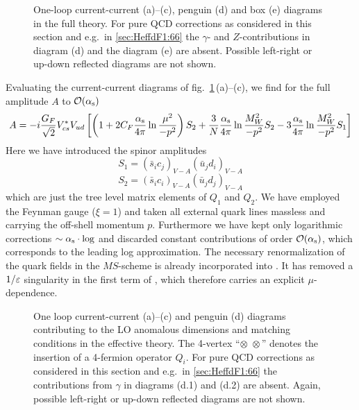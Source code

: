 \begin{figure}[htb]
\vspace{0.10in}
\centerline{
\epsfysize=3in
}
\vspace{0.08in}
\caption[]{One-loop current-current (a)--(c), penguin (d) and box (e)
diagrams in the full theory. For pure QCD corrections as considered in
this section and e.g.\ in \ref{sec:HeffdF1:66} the $\gamma$- and
$Z$-contributions in diagram (d) and the diagram (e) are absent.
Possible left-right or up-down reflected diagrams are not shown.
\label{fig:1loopful}}
\end{figure}

Evaluating the current-current diagrams of fig.~\ref{fig:1loopful}\,(a)--(c),
we find for the full amplitude $A$ to ${\cal O}(\alpha_{\rm s})$
\begin{equation}\label{amp}
A=-i{G_F\over\sqrt{2}}V^\ast_{cs}V_{ud}\left[\left(1+2C_F \frac{\alpha_{\rm s}}{4 \pi}
\ln{\mu^2\over -p^2}\right)S_2+{3\over N}\frac{\alpha_{\rm s}}{4 \pi}\ln{M^2_W\over -p^2} S_2-
3\frac{\alpha_{\rm s}}{4 \pi}\ln{M^2_W\over -p^2} S_1\right]   \end{equation}
Here we have introduced the spinor amplitudes
\begin{equation}\label{s1c} S_1=(\bar s_ic_j)_{V-A}(\bar u_jd_i)_{V-A}
\end{equation}
\begin{equation}\label{s2c} S_2=(\bar s_ic_i)_{V-A}(\bar u_jd_j)_{V-A}
\end{equation}
which are just the tree level matrix elements of $Q_1$ and $Q_2$.
We have employed the Feynman gauge ($\xi=1$) and taken all external
quark lines massless and carrying the off-shell momentum $p$.
Furthermore we have kept only logarithmic corrections
$\sim\alpha_{\rm s}\cdot\log$ and discarded constant contributions of order
${\cal O}(\alpha_{\rm s})$, which corresponds to the leading log approximation.
The necessary renormalization of the quark fields in the $MS$-scheme
is already incorporated into . It has removed a $1/\varepsilon$
singularity in the first term of , which therefore carries
an explicit $\mu$-dependence.

\begin{figure}[htb]
\vspace{0.10in}
\centerline{
\epsfysize=3in
}
\vspace{0.08in}
\caption[]{One loop current-current (a)--(c) and penguin (d) diagrams
contributing to the LO anomalous dimensions and matching conditions in
the effective theory. The 4-vertex ``$\otimes\,\,\otimes$'' denotes the
insertion of a 4-fermion operator $Q_i$. For pure QCD corrections as
considered in this section and e.g.\ in \ref{sec:HeffdF1:66} the
contributions from $\gamma$ in diagrams (d.1) and (d.2) are absent.
Again, possible left-right or up-down reflected diagrams are not
shown.
\label{fig:1loopeff}}
\end{figure}

